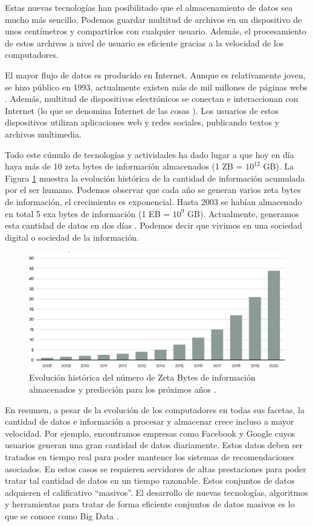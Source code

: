 \documentclass[10pt]{article}
\begin{document}
	Estas nuevas tecnologías han posibilitado que el almacenamiento de datos sea mucho más sencillo. Podemos guardar multitud de archivos en un dispositivo de unos centímetros y compartirlos con cualquier usuario. Además, el procesamiento de estos archivos a nivel de usuario es eficiente gracias a la velocidad de los computadores. 
	
	El mayor flujo de datos es producido en Internet. Aunque es relativamente joven, se hizo público en 1993, actualmente existen más de mil millones de páginas webs \cite{internet}. Además, multitud de dispositivos electrónicos se conectan e interaccionan con Internet (lo que se denomina Internet de las cosas \cite{big-data-internet-cosas}). Los usuarios de estos dispositivos utilizan aplicaciones web y redes sociales, publicando textos y archivos multimedia. 
	
	Todo este cúmulo de tecnologías y actividades ha dado lugar a que hoy en día haya más de 10 zeta bytes de información almacenados (1 ZB = $10^{12}$ GB). La Figura \ref{fig:zeta-bytes} muestra la evolución histórica de la cantidad de información acumulada por el ser humano. Podemos observar que cada año se generan varios zeta bytes de información, el crecimiento es exponencial. Hasta 2003 se habían almacenado en total 5 exa bytes de información (1 EB = $10^9$ GB). Actualmente, generamos esta cantidad de datos en dos días \cite{big-data}. Podemos decir que vivimos en una sociedad digital o sociedad de la información.

	\begin{figure}[H]
	       	\centering
	       	\includegraphics[width=14cm]{./images/Data.png}
	       	\caption{Evolución histórica del número de Zeta Bytes de información almacenados y predicción para los próximos años \cite{zeta-bytes}.} 
	       	\label{fig:zeta-bytes}
	 \end{figure}

	En resumen, a pesar de la evolución de los computadores en todas sus facetas, la cantidad de datos e información a procesar y almacenar crece incluso a mayor velocidad. Por ejemplo, encontramos empresas como Facebook y Google cuyos usuarios generan una gran cantidad de datos diariamente. Estos datos deben ser tratados en tiempo real para poder mantener los sistemas de recomendaciones asociados. En estos casos se requieren servidores de altas prestaciones para poder tratar tal cantidad de datos en un tiempo razonable. Estos conjuntos de datos adquieren el calificativo ``masivos''. El desarrollo de nuevas tecnologías, algoritmos y herramientas para tratar de forma eficiente conjuntos de datos masivos es lo que se conoce como Big Data \cite{big-data-herrera}.
	
\end{document}
